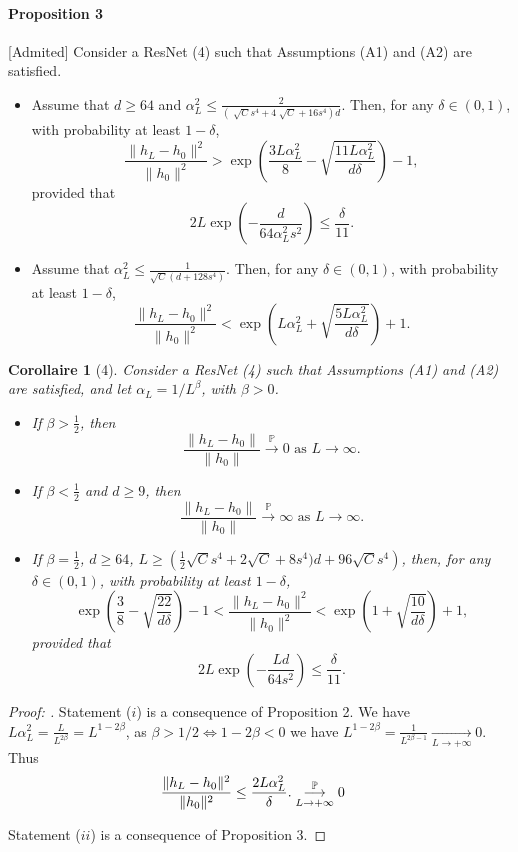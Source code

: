 \documentclass{report}
\theoremstyle{plain}%
\newtheorem*{cor}{Corollaire}
\theoremstyle{definition}
\theoremstyle{remark}
\begin{document}
\paragraph*{Proposition 3}[Admited] Consider a ResNet (4) such that Assumptions (A1) and (A2) are satisfied.
\begin{itemize}
    \item[(i)] Assume that $d \geq 64$ and $ \alpha _L ^2 \leq  \frac{2 }{(\sqrt[]{C } s^4 + 4 \sqrt[]{C } + 16 s ^4)d}$. Then, for any $\delta \in (0, 1)$, with probability at least $1 - \delta$,
    \[
    \frac{\|h_L - h_0\|^2}{\|h_0\|^2} > \exp\left(\frac{3L\alpha_L^2}{8} - \sqrt{\frac{11L\alpha_L^2}{d\delta}}\right) - 1,
    \]
    provided that
    \[
    2L \exp\left(-\frac{d}{64\alpha_L^2s^2}\right) \leq \frac{\delta}{11}.
    \]

    \item[(ii)] Assume that $\alpha_L^2 \leq \frac{1}{\sqrt{C}(d + 128s^4)}$. Then, for any $\delta \in (0, 1)$, with probability at least $1 - \delta$,
    \[
    \frac{\|h_L - h_0\|^2}{\|h_0\|^2} < \exp\left(L\alpha_L^2 + \sqrt{\frac{5L\alpha_L^2}{d\delta}}\right) + 1.
    \]
\end{itemize}

\begin{cor}[4]
    Consider a ResNet (4) such that Assumptions (A1) and (A2) are satisfied, and let $\alpha_L = 1/L^\beta$, with $\beta > 0$.
\begin{itemize}
    \item[(i)] If $\beta > \frac{1}{2}$, then
    \[
    \frac{\|h_L - h_0\|}{\|h_0\|} \xrightarrow{\mathbb{P}} 0 \text{ as } L \to \infty.
    \]
    \item[(ii)] If $\beta < \frac{1}{2}$ and $d \geq 9$, then
    \[
    \frac{\|h_L - h_0\|}{\|h_0\|} \xrightarrow{\mathbb{P}} \infty \text{ as } L \to \infty.
    \]
    \item[(iii)] If $\beta = \frac{1}{2}$, $d \geq 64$, $L \geq \left(\frac{1}{2}\sqrt{C}s^4 + 2\sqrt{C} + 8s^4)d + 96\sqrt{C}s^4\right)$, then, for any $\delta \in (0, 1)$, with probability at least $1 - \delta$,
    \[
    \exp\left(\frac{3}{8} - \sqrt{\frac{22}{d\delta}}\right) - 1 < \frac{\|h_L - h_0\|^2}{\|h_0\|^2} < \exp\left(1 + \sqrt{\frac{10}{d\delta}}\right) + 1,
    \]
    provided that
    \[
    2L \exp\left(-\frac{Ld}{64s^2}\right) \leq \frac{\delta}{11}.
    \]
\end{itemize}

\end{cor}
\begin{proof}[Proof: ]
    Statement ($ i $) is a consequence of Proposition 2. We have $ L \alpha _L ^2 = \frac{L}{L^{2\beta} } = L^{1 - 2 \beta } $, as $ \beta > 1/2 \Leftrightarrow 1 - 2 \beta < 0$ we have $L^{1 - 2 \beta } = \frac{1}{L^{2 \beta  -1}} \underset{L\to +\infty}{\longrightarrow} 0 $. Thus
    \begin{align*}
        & \frac{\|h_L - h_0\|^2}{\|h_0\|^2} \leq \frac{2L\alpha_L^2}{\delta}.
        \overunderset{\mathbb{P}}{L\to +\infty}{\longrightarrow} 0 
    \end{align*}

    Statement ($ ii $) is a consequence of Proposition 3.


\end{proof}
\end{document}
